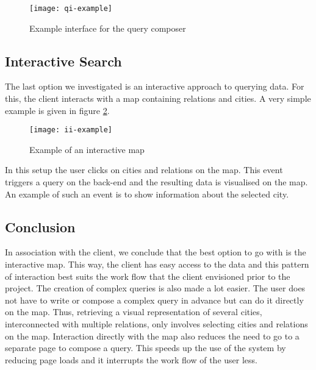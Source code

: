 \begin{figure}[ht]
\centering
\texttt{[image: qi-example]}
\caption{Example interface for the query composer}
\label{fig:qi-example}
\end{figure}

\subsection{Interactive Search}

The last option we investigated is an interactive approach to querying data. For this, the client interacts with a map containing relations and cities. A very simple example is given in figure \ref{fig:ii-example}.

\begin{figure}[ht]
\centering
\texttt{[image: ii-example]}
\caption{Example of an interactive map}
\label{fig:ii-example}
\end{figure}

In this setup the user clicks on cities and relations on the map. This event triggers a query on the back-end and the resulting data is visualised on the map. An example of such an event is to show information about the selected city.

\subsection{Conclusion}

In association with the client, we conclude that the best option to go with is the interactive map.
This way, the client has easy access to the data and this pattern of interaction best suits the work flow that the client envisioned prior to the project. The creation of complex queries is also made a lot easier. The user does not have to write or compose a complex query in advance but can do it directly on the map. Thus, retrieving a visual representation of several cities, interconnected with multiple relations, only involves selecting cities and relations on the map. Interaction directly with the map also reduces the need to go to a separate page to compose a query. This speeds up the use of the system by reducing page loads and it interrupts the work flow of the user less.
